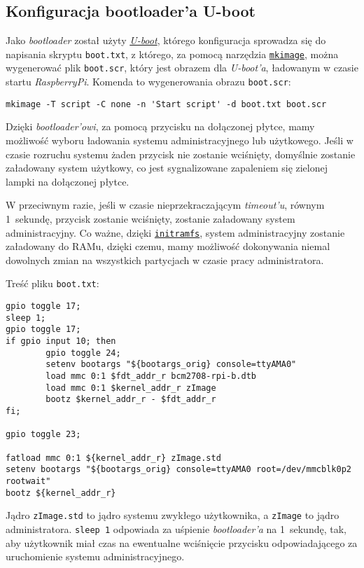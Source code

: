 \documentclass{article}
\begin{document}

\subsection{Konfiguracja bootloader'a U-boot}

Jako \emph{bootloader} został użyty \href{http://www.denx.de/wiki/u-boot/}{\emph{U-boot}}, którego konfiguracja sprowadza się do napisania skryptu \texttt{boot.txt}, z którego, za pomocą narzędzia \href{http://linux.die.net/man/1/mkimage}{\texttt{mkimage}}, można wygenerować plik \texttt{boot.scr}, który jest obrazem dla \emph{U-boot'a}, ładowanym w czasie startu \emph{RaspberryPi}. Komenda to wygenerowania obrazu \texttt{boot.scr}:
\begin{verbatim}
mkimage -T script -C none -n 'Start script' -d boot.txt boot.scr
\end{verbatim}

Dzięki \emph{bootloader'owi}, za pomocą przycisku na dołączonej płytce, mamy możliwość wyboru ładowania systemu administracyjnego lub użytkowego. Jeśli w czasie rozruchu systemu żaden przycisk nie zostanie wciśnięty, domyślnie zostanie załadowany system użytkowy, co jest sygnalizowane zapaleniem się zielonej lampki na dołączonej płytce.

W przeciwnym razie, jeśli w czasie nieprzekraczającym \emph{timeout'u}, równym 1~sekundę, przycisk zostanie wciśnięty, zostanie załadowany system administracyjny. Co ważne, dzięki \href{https://www.kernel.org/doc/Documentation/filesystems/ramfs-rootfs-initramfs.txt}{\texttt{initramfs}}, system administracyjny zostanie załadowany do RAMu, dzięki czemu, mamy możliwość dokonywania niemal dowolnych zmian na wszystkich partycjach w czasie pracy administratora.

Treść pliku \texttt{boot.txt}:
\begin{lstlisting}[frame=single,breaklines,basicstyle=\small]
gpio toggle 17;
sleep 1;
gpio toggle 17;
if gpio input 10; then
        gpio toggle 24;
        setenv bootargs "${bootargs_orig} console=ttyAMA0"
        load mmc 0:1 $fdt_addr_r bcm2708-rpi-b.dtb
        load mmc 0:1 $kernel_addr_r zImage
        bootz $kernel_addr_r - $fdt_addr_r
fi;

gpio toggle 23;

fatload mmc 0:1 ${kernel_addr_r} zImage.std
setenv bootargs "${bootargs_orig} console=ttyAMA0 root=/dev/mmcblk0p2 rootwait"
bootz ${kernel_addr_r}
\end{lstlisting}
Jądro \texttt{zImage.std} to jądro systemu zwykłego użytkownika, a \texttt{zImage} to jądro administratora. \texttt{sleep 1} odpowiada za uśpienie \emph{bootloader'a} na 1~sekundę, tak, aby użytkownik miał czas na ewentualne wciśnięcie przycisku odpowiadającego za uruchomienie systemu administracyjnego.
\end{document}
